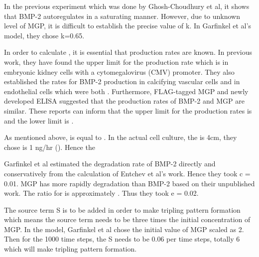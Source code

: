 \documentclass{article}
\begin{document}
In the previous experiment which was done by Ghosh-Choudhury et al, it shows that BMP-2 autoregulates in a saturating manner. However, due to unknown level of MGP, it is difficult to establish the precise value of k. In Garfinkel et al’s model, they chose k=0.65.

In order to calculate , it is essential that production rates are known. In previous work, they have found the upper limit for the production rate which is in embryonic kidney cells with a cytomegalovirus (CMV) promoter. They also established the rates for BMP-2 production in calcifying vascular cells and in endothelial cells which were both . Furthermore, FLAG-tagged MGP and newly developed ELISA suggested that the production rates of BMP-2 and MGP are similar. These reports can inform that the upper limit for the production rates is  and the lower limit is .

 As mentioned above,  is equal to . In the actual cell culture, the is 4cm,  they chose is 1 ng/hr (). Hence the 

Garfinkel et al estimated the degradation rate of BMP-2 directly and conservatively from the calculation of Entchev et al’s work. Hence they took c = 0.01. MGP has more rapidly degradation than BMP-2 based on their unpublished work. The ratio for  is approximately . Thus they took e = 0.02.

The source term S is to be added in order to make tripling pattern formation which means the source term needs to be three times the initial concentration of MGP. In the model, Garfinkel et al chose the initial value of MGP scaled as 2. Then for the 1000 time steps, the S needs to be 0.06 per time steps, totally 6 which will make tripling pattern formation.
\end{document}
